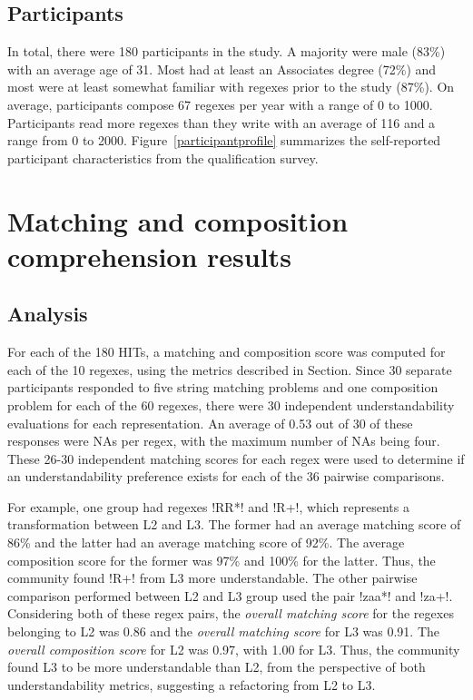 \subsection{Participants}

In total, there were 180 participants in the study.
A majority were male (83\%) with an average age of 31. Most had
at least an Associates degree (72\%) and most were at least somewhat familiar with regexes prior to the study (87\%). On average,
participants compose 67 regexes per year with a range of 0 to 1000.
Participants read more regexes than they write with an average of 116 and a range from 0 to 2000.
Figure~\ref{participantprofile} summarizes the self-reported participant characteristics from the qualification survey.

\section{Matching and composition comprehension results}



\subsection{Analysis}
For each of the 180 HITs, a matching and composition score was computed for each of the 10 regexes, using the metrics described in Section.  Since 30 separate participants responded to five string matching problems and one composition problem for each of the 60 regexes, there were 30 independent understandability evaluations for each representation.  An average of 0.53 out of 30 of these responses were NAs per regex, with the maximum number of NAs being four.  These 26-30 independent matching scores for each regex were used to determine if an understandability preference exists for each of the 36 pairwise comparisons.

For example, one group had regexes \cverb!RR*! and \cverb!R+!, which  represents a transformation between L2 and L3. The former had an average matching score of 86\% and the latter had an average matching score of 92\%. The average composition score for the former was 97\% and 100\% for the latter. Thus, the community found \cverb!R+! from L3 more understandable.
The other pairwise comparison performed between L2 and L3 group used the pair \cverb!zaa*! and \cverb!za+!.
Considering both of these regex pairs, the \emph{overall matching score} for the regexes belonging to L2 was 0.86 and the \emph{overall matching score} for L3 was 0.91.
The \emph{overall composition score} for L2 was 0.97, with 1.00 for L3. Thus, the community found L3 to be more understandable than L2, from the perspective of both understandability metrics, suggesting a refactoring from L2 to L3.

